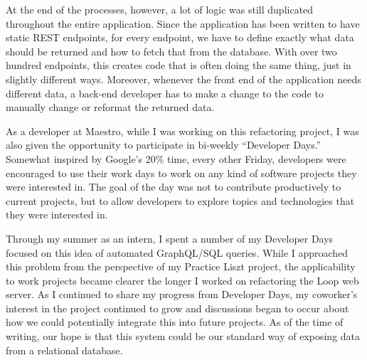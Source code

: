At the end of the processes, however, a lot of logic was still duplicated throughout the entire application.  Since the application has been written to have static REST endpoints, for every endpoint, we have to define exactly what data should be returned and how to fetch that from the database. With over two hundred endpoints, this creates code that is often doing the same thing, just in slightly different ways.  Moreover, whenever the front end of the application needs different data, a back-end developer has to make a change to the code to manually change or reformat the returned data.

As a developer at Maestro, while I was working on this refactoring project, I was also given the opportunity to participate in bi-weekly ``Developer Days.''  Somewhat inspired by Google's 20\% time, every other Friday, developers were encouraged to use their work days to work on any kind of software projects they were interested in.  The goal of the day was not to contribute productively to current projects, but to allow developers to explore topics and technologies that they were interested in.

Through my summer as an intern, I spent a number of my Developer Days focused on this idea of automated GraphQL/SQL queries. While I approached this problem from the perspective of my Practice Liszt project, the applicability to work projects became clearer the longer I worked on refactoring the Loop web server.  As I continued to share my progress from Developer Days, my coworker's interest in the project continued to grow and discussions began to occur about how we could potentially integrate this into future projects.  As of the time of writing, our hope is that this system could be our standard way of exposing data from a relational database.